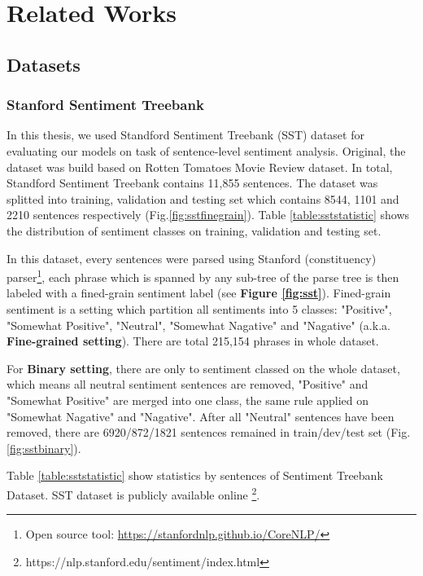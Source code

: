 \chapter{Related Works}\label{chap:related-work}

\section{Datasets}\label{sec:dataset}
\subsection{Stanford Sentiment Treebank} \label{sec:sst}
In this thesis, we used Standford Sentiment Treebank (SST) dataset\cite{socher2013recursive} for evaluating our models on task of sentence-level sentiment analysis. 
Original, the dataset was build based on Rotten Tomatoes Movie Review dataset\cite{Rotten-Tomato}\cite{socher2013recursive}. 
In total, Standford Sentiment Treebank contains 11,855 sentences. 
The dataset was splitted into training, validation and testing set which contains 8544, 1101 and 2210 sentences respectively (Fig.\ref{fig:sstfinegrain}).
Table \ref{table:sststatistic} shows the distribution of sentiment classes on training, validation and testing set. 

In this dataset, every sentences were parsed using Stanford (constituency) parser\cite{socher2013recursive}\footnote{Open source tool: \url{https://stanfordnlp.github.io/CoreNLP/}}, each phrase which is spanned by any sub-tree of the parse tree is then labeled with  a fined-grain sentiment label (see \textbf{Figure \ref{fig:sst}}). 
Fined-grain sentiment is a setting which partition all sentiments into 5 classes: "Positive", "Somewhat Positive", "Neutral", "Somewhat Nagative" and "Nagative"\cite{socher2013recursive} (a.k.a. \textbf{Fine-grained setting}).
There are total 215,154 phrases in whole dataset. 

For \textbf{Binary setting}, there are only to sentiment classed on the whole dataset, which means all neutral sentiment sentences are removed, "Positive" and "Somewhat Positive" are merged into one class, the same rule applied on "Somewhat Nagative" and "Nagative"\cite{socher2013recursive}.   
After all "Neutral" sentences have been removed, there are 6920/872/1821 sentences remained in train/dev/test set (Fig. \ref{fig:sstbinary}).


Table \ref{table:sststatistic} show statistics by sentences of Sentiment Treebank Dataset.
SST dataset is publicly available online \footnote{https://nlp.stanford.edu/sentiment/index.html}. 

